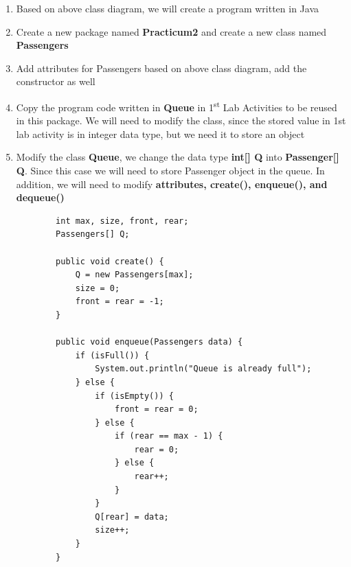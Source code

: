 \documentclass[12pt,titlepage]{article}
\begin{document}
\begin{enumerate}
    \item Based on above class diagram, we will create a program written in Java
    \item Create a new package named \textbf{Practicum2} and create a new class named \textbf{Passengers}
    \item Add attributes for Passengers based on above class diagram, add the constructor as well
    \item Copy the program code written in \textbf{Queue} in 1\textsuperscript{st} Lab Activities to be reused in this package. We will need to modify the class, since the stored value in 1st lab activity is in integer data type, but we need it to store an object
    \item Modify the class \textbf{Queue}, we change the data type \textbf{int[] Q} into \textbf{Passenger[] Q}. Since this case we will need to store Passenger object in the queue. In addition, we will need to modify \textbf{attributes, create(), enqueue(), and dequeue()}
    \begin{verbatim}
        int max, size, front, rear;
        Passengers[] Q;
        
        public void create() {
            Q = new Passengers[max];
            size = 0;
            front = rear = -1;
        }

        public void enqueue(Passengers data) {
            if (isFull()) {
                System.out.println("Queue is already full");
            } else {
                if (isEmpty()) {
                    front = rear = 0;
                } else {
                    if (rear == max - 1) {
                        rear = 0;
                    } else {
                        rear++;
                    }
                }
                Q[rear] = data;
                size++;
            }
        }


\end{verbatim}
\end{enumerate}
\end{document}
